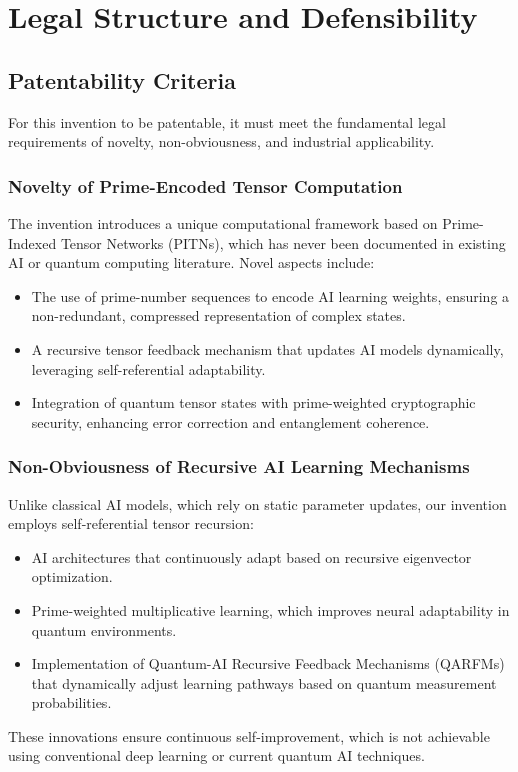 \documentclass{article}
\theoremstyle{plain}
\begin{document}
\section{Legal Structure and Defensibility}

\subsection{Patentability Criteria}
For this invention to be patentable, it must meet the fundamental legal requirements of novelty, non-obviousness, and industrial applicability.

\subsubsection{Novelty of Prime-Encoded Tensor Computation}
The invention introduces a unique computational framework based on Prime-Indexed Tensor Networks (PITNs), which has never been documented in existing AI or quantum computing literature. Novel aspects include:
\begin{itemize}
    \item The use of prime-number sequences to encode AI learning weights, ensuring a non-redundant, compressed representation of complex states.
    \item A recursive tensor feedback mechanism that updates AI models dynamically, leveraging self-referential adaptability.
    \item Integration of quantum tensor states with prime-weighted cryptographic security, enhancing error correction and entanglement coherence.
\end{itemize}

\subsubsection{Non-Obviousness of Recursive AI Learning Mechanisms}
Unlike classical AI models, which rely on static parameter updates, our invention employs self-referential tensor recursion:
\begin{itemize}
    \item AI architectures that continuously adapt based on recursive eigenvector optimization.
    \item Prime-weighted multiplicative learning, which improves neural adaptability in quantum environments.
    \item Implementation of Quantum-AI Recursive Feedback Mechanisms (QARFMs) that dynamically adjust learning pathways based on quantum measurement probabilities.
\end{itemize}
These innovations ensure continuous self-improvement, which is not achievable using conventional deep learning or current quantum AI techniques.
\end{document}
